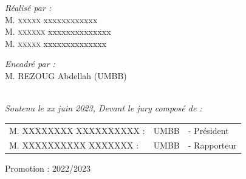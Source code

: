\documentclass[a4paper,12pt]{report}
\begin{document}
\begin{titlepage}
\noindent
\begin{minipage}{0.5\textwidth}
    \vspace{-7mm}
  \begin{flushleft} \large
    \emph{Réalisé par :}\\
    M. \textsc{xxxxx} xxxxxxxxxxxx \\[0.1cm] 
    M. \textsc{xxxxxx} xxxxxxxxxxxxxx \\[0.1cm] 
    M. \textsc{xxxxx} xxxxxxxxxxxxxx \\
    
  \end{flushleft}
\end{minipage}
\begin{minipage}{0.4\textwidth}
  \begin{flushright} \large
    \begin{flushleft} \large
    \emph{Encadré par :} \\
    M. \textsc{REZOUG} Abdellah  (UMBB)\\[0.1cm] 
    \end{flushleft}

  \end{flushright}
\end{minipage}\\[1cm]

{\large \textit{Soutenu le xx juin 2023, Devant le jury composé de : }}\\[0.5cm]

\centering
\begin{tabular}{lll}
\large M. XXXXXXXX \textsc{XXXXXXXXXX} : & \large UMBB & \large - Président \\[0.1cm]
\large M. XXXXXXXXXX \textsc{XXXXXXX} : & \large UMBB & \large - Rapporteur
\end{tabular}

\vspace{20mm}
{\large Promotion : 2022/2023}

\end{titlepage}
\end{document}
